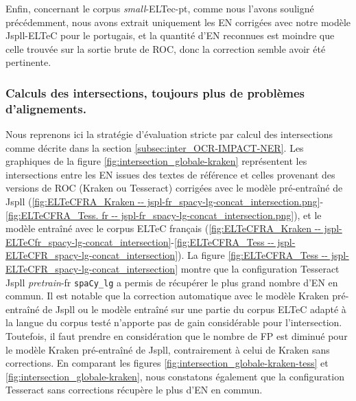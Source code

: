   
Enfin, concernant le corpus \textit{small}-ELTec-pt, comme nous l'avons souligné précédemment, nous avons extrait uniquement les EN corrigées avec notre modèle Jspll-ELTeC pour le portugais, et la quantité d'EN reconnues est moindre que celle trouvée sur la sortie brute de ROC, donc la correction semble avoir été pertinente.

\subsubsection{Calculs des intersections, toujours plus de problèmes d'alignements. }

Nous reprenons ici la stratégie d'évaluation stricte par calcul des intersections comme décrite dans la section \ref{subsec:inter_OCR-IMPACT-NER}.
Les graphiques de la figure \ref{fig:intersection_globale-kraken} représentent les intersections entre les EN issues des textes de référence et celles provenant des versions de ROC (Kraken ou Tesseract) corrigées avec le modèle pré-entraîné de Jspll (\ref{fig:ELTeCFRA_Kraken -- jspl-fr_spacy-lg-concat_intersection.png}-\ref{fig:ELTeCFRA_Tess. fr -- jspl-fr_spacy-lg-concat_intersection.png}), et le modèle entraîné avec le corpus ELTeC français (\ref{fig:ELTeCFRA_Kraken -- jspl-ELTeCfr_spacy-lg-concat_intersection}-\ref{fig:ELTeCFRA_Tess -- jspl-ELTeCFR_spacy-lg-concat_intersection}). 
La figure \ref{fig:ELTeCFRA_Tess -- jspl-ELTeCFR_spacy-lg-concat_intersection} montre que la configuration Tesseract Jspll \textit{pretrain}-fr \texttt{spaCy\_lg} a permis de récupérer le plus grand nombre d'EN en commun. Il est notable que la correction automatique avec le modèle Kraken pré-entraîné de Jspll ou le modèle entraîné sur une partie du corpus ELTeC adapté à la langue du corpus testé n'apporte pas de gain considérable pour l'intersection. Toutefois, il faut prendre en considération que le nombre de FP est diminué pour le modèle Kraken pré-entraîné de Jspll, contrairement à celui de Kraken sans corrections. En comparant les figures \ref{fig:intersection_globale-kraken-tess} et \ref{fig:intersection_globale-kraken}, nous constatons également que la configuration Tesseract sans corrections récupère le plus d'EN en commun. 
